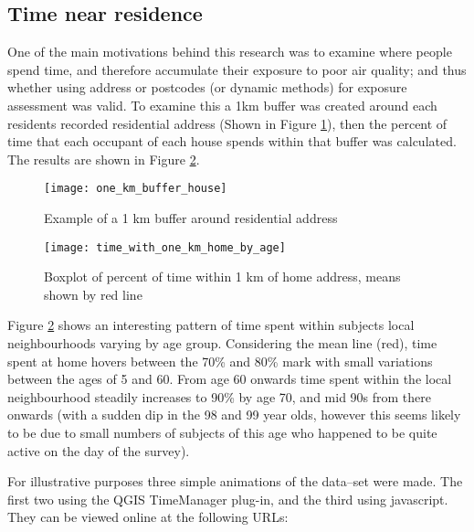 \subsection{Time near residence}
\label{sec:time_near_residence}

One of the main motivations behind this research was to examine where people spend time, and therefore accumulate their exposure to poor air quality; and thus whether using address or postcodes (or dynamic methods) for exposure assessment was valid. To examine this a 1km buffer was created around each residents recorded residential address (Shown in Figure \ref{fig:one_km_buffer_house}), then the percent of time that each occupant of each house spends within that buffer was calculated. The results are shown in Figure \ref{fig:time_with_one_km_home_by_age}.

\begin{figure}[H]
\centering
\texttt{[image: one\_km\_buffer\_house]}
\caption{Example of a 1 km buffer around residential address}
\label{fig:one_km_buffer_house}
\end{figure}

\begin{landscape}

\begin{figure}[H]
\centering
\texttt{[image: time\_with\_one\_km\_home\_by\_age]}
\caption{Boxplot of percent of time within 1 km of home address, means shown by red line}
\label{fig:time_with_one_km_home_by_age}
\end{figure}

\end{landscape}

Figure \ref{fig:time_with_one_km_home_by_age} shows an interesting pattern of time spent within subjects local neighbourhoods varying by age group. Considering the mean line (red), time spent at home hovers between the 70\% and 80\% mark with small variations between the ages of 5 and 60. From age 60 onwards time spent within the local neighbourhood steadily increases to 90\% by age 70, and mid 90s from there onwards (with a sudden dip in the 98 and 99 year olds, however this seems likely to be due to small numbers of subjects of this age who happened to be quite active on the day of the survey).

For illustrative purposes three simple animations of the data--set were made. The first two using the QGIS TimeManager plug-in, and the third using javascript. They can be viewed online at the following URLs:

